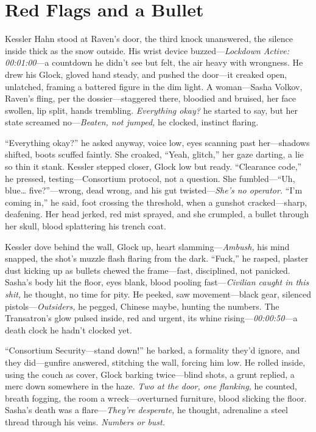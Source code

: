 \documentclass[12pt]{book}
\begin{document}
\section{Red Flags and a Bullet}

Kessler Hahn stood at Raven’s door, the third knock unanswered, the silence inside thick as the snow outside. His wrist device buzzed—\textit{Lockdown Active: 00:01:00}—a countdown he didn’t see but felt, the air heavy with wrongness. He drew his Glock, gloved hand steady, and pushed the door—it creaked open, unlatched, framing a battered figure in the dim light. A woman—Sasha Volkov, Raven’s fling, per the dossier—staggered there, bloodied and bruised, her face swollen, lip split, hands trembling. \textit{Everything okay?} he started to say, but her state screamed no—\textit{Beaten, not jumped,} he clocked, instinct flaring.

“Everything okay?” he asked anyway, voice low, eyes scanning past her—shadows shifted, boots scuffed faintly. She croaked, “Yeah, glitch,” her gaze darting, a lie so thin it stank. Kessler stepped closer, Glock low but ready. “Clearance code,” he pressed, testing—Consortium protocol, not a question. She fumbled—“Uh, blue… five?”—wrong, dead wrong, and his gut twisted—\textit{She’s no operator.} “I’m coming in,” he said, foot crossing the threshold, when a gunshot cracked—sharp, deafening. Her head jerked, red mist sprayed, and she crumpled, a bullet through her skull, blood splattering his trench coat.

Kessler dove behind the wall, Glock up, heart slamming—\textit{Ambush,} his mind snapped, the shot’s muzzle flash flaring from the dark. “Fuck,” he rasped, plaster dust kicking up as bullets chewed the frame—fast, disciplined, not panicked. Sasha’s body hit the floor, eyes blank, blood pooling fast—\textit{Civilian caught in this shit,} he thought, no time for pity. He peeked, saw movement—black gear, silenced pistols—\textit{Outsiders,} he pegged, Chinese maybe, hunting the numbers. The Transatron’s glow pulsed inside, red and urgent, its whine rising—\textit{00:00:50}—a death clock he hadn’t clocked yet.

“Consortium Security—stand down!” he barked, a formality they’d ignore, and they did—gunfire answered, stitching the wall, forcing him low. He rolled inside, using the couch as cover, Glock barking twice—blind shots, a grunt replied, a merc down somewhere in the haze. \textit{Two at the door, one flanking,} he counted, breath fogging, the room a wreck—overturned furniture, blood slicking the floor. Sasha’s death was a flare—\textit{They’re desperate,} he thought, adrenaline a steel thread through his veins. \textit{Numbers or bust.}
\end{document}
